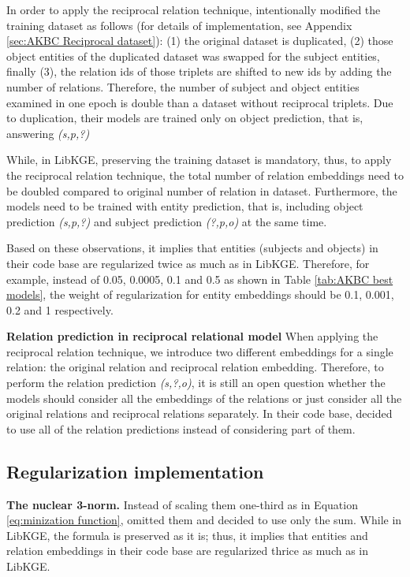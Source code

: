 In order to apply the reciprocal relation technique, \citet{chen2021relation} intentionally modified the training dataset as follows (for details of implementation, see Appendix \ref{sec:AKBC Reciprocal dataset}): (1) the original dataset is duplicated, (2) those object entities of the duplicated dataset was swapped for the subject entities, finally (3), the relation ids of those triplets are shifted to new ids by adding the number of relations. Therefore, the number of subject and object entities examined in one epoch is double than a dataset without reciprocal triplets. Due to duplication, their models are trained only on object prediction, that is, answering \textit{(s,p,?)}

While, in LibKGE, preserving the training dataset is mandatory, thus, to apply the reciprocal relation technique, the total number of relation embeddings need to be doubled compared to original number of relation in dataset. Furthermore, the models need to be trained with entity prediction, that is, including object prediction \textit{(s,p,?)} and subject prediction \textit{(?,p,o)} at the same time. 


Based on these observations, it implies that entities (subjects and objects) in their code base are regularized twice as much as in LibKGE. Therefore, for example, instead of 0.05, 0.0005, 0.1 and 0.5 as shown in Table \ref{tab:AKBC best models}, the weight of regularization for entity embeddings should be 0.1, 0.001, 0.2 and 1 respectively.
\newline

\noindent\textbf{Relation prediction in reciprocal relational model}
When applying the reciprocal relation technique, we introduce two different embeddings for a single relation: the original relation and reciprocal relation embedding. Therefore, to perform the relation prediction \textit{(s,?,o)}, it is still an open question whether the models should consider all the embeddings of the relations or just consider all the original relations and reciprocal relations separately. In their code base, \citet{chen2021relation} decided to use all of the relation predictions instead of considering part of them.  

\subsection{Regularization implementation}


\noindent\textbf{The nuclear 3-norm.} Instead of scaling them one-third as in Equation \ref{eq:minization function}, \citet{chen2021relation} omitted them and decided to use only the sum. While in LibKGE, the formula is preserved as it is; thus, it implies that entities and relation embeddings in their code base are regularized thrice as much as in LibKGE.

